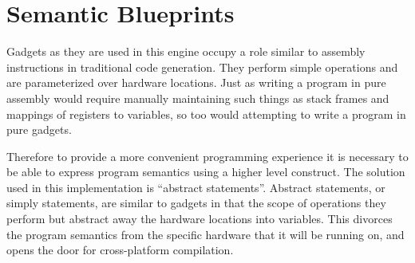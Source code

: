    \begin{table}
        \centering
        \caption[Concrete examples of gadgets.]
        {Concrete examples of gadgets along with their associated clobber set}
        \label{tab:method-clobber}
    \end{table}

    \section{Semantic Blueprints}

    Gadgets as they are used in this engine occupy a role similar to assembly
    instructions in traditional code generation. They perform simple operations
    and are parameterized over hardware locations. Just as writing a program in
    pure assembly would require manually maintaining such things as stack frames
    and mappings of registers to variables, so too would attempting to write a
    program in pure gadgets. 

    Therefore to provide a more convenient programming experience it is
    necessary to be able to express program semantics using a higher level
    construct. The solution used in this implementation is ``abstract
    statements''. Abstract statements, or simply statements, are similar to
    gadgets in that the scope of operations they perform but abstract away the
    hardware locations into variables. This divorces the program semantics from
    the specific hardware that it will be running on, and opens the door for
    cross-platform compilation.


